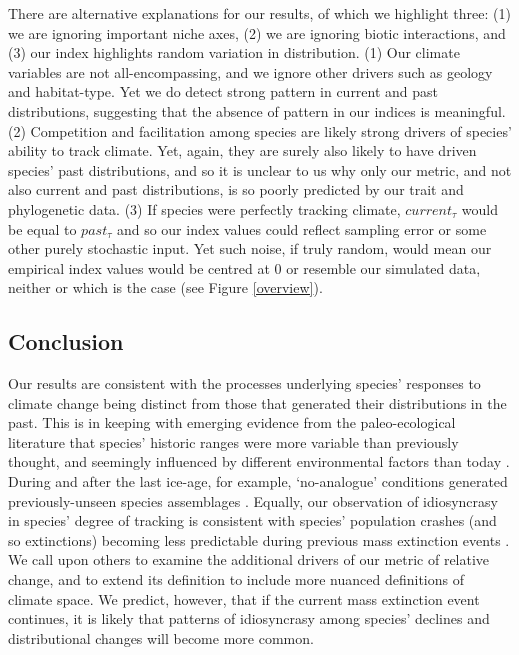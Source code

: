 \documentclass[12pt]{report}
\begin{document}
There are alternative explanations for our results, of which we
highlight three: (1) we are ignoring important niche axes, (2) we are
ignoring biotic interactions, and (3) our index highlights random
variation in distribution. (1) Our climate variables are not
all-encompassing, and we ignore other drivers such as geology and
habitat-type. Yet we do detect strong pattern in current and past
distributions, suggesting that the absence of pattern in our indices
is meaningful. (2) Competition and facilitation among species are
likely strong drivers of species' ability to track
climate\supercite{Davis1999}. Yet, again, they are surely also likely
to have driven species' past distributions, and so it is unclear to us
why only our metric, and not also current and past distributions, is
so poorly predicted by our trait and phylogenetic data. (3) If species
were perfectly tracking climate, $current_\tau$ would be equal to
$past_\tau$ and so our index values could reflect sampling error or
some other purely stochastic input. Yet such noise, if truly random,
would mean our empirical index values would be centred at 0 or
resemble our simulated data, neither or which is the case (see Figure
\ref{overview}).

\clearpage
\subsection*{Conclusion}
Our results are consistent with the processes underlying species'
responses to climate change being distinct from those that generated
their distributions in the past. This is in keeping with emerging
evidence from the paleo-ecological literature that species' historic
ranges were more variable than previously thought, and seemingly
influenced by different environmental factors than today
\supercite{Veloz2012,Maguire2015}. During and after the last ice-age,
for example, `no-analogue' conditions generated previously-unseen
species assemblages \supercite{Williams2007}. Equally, our observation
of idiosyncrasy in species' degree of tracking is consistent with
species' population crashes (and so extinctions) becoming less
predictable during previous mass extinction events
\supercite{Levinton2001,Jablonski2004}. We call upon others to examine
the additional drivers of our metric of relative change, and to extend
its definition to include more nuanced definitions of climate
space. We predict, however, that if the current mass extinction event
continues, it is likely that patterns of idiosyncrasy among species'
declines and distributional changes will become more common.
\end{document}
